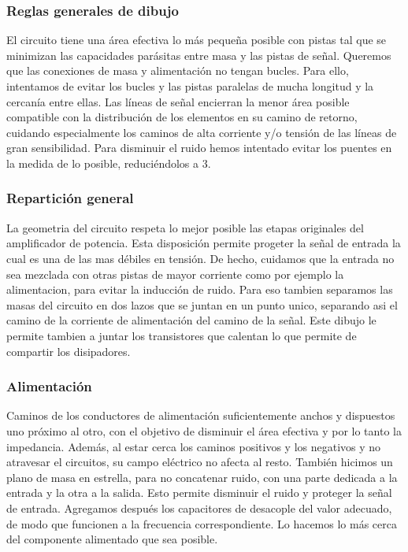 
\subsubsection*{Reglas generales de dibujo}

El circuito tiene una área efectiva lo más pequeña posible con pistas tal que se minimizan las capacidades parásitas entre masa y las pistas de señal.
Queremos que las conexiones de masa y alimentación no tengan bucles. Para ello, intentamos de evitar los bucles y las pistas paralelas de mucha longitud y la cercanía entre ellas.
Las líneas de señal encierran la menor área posible compatible con la distribución de los elementos en su camino de retorno, cuidando especialmente los caminos de alta corriente y/o tensión de las líneas de gran sensibilidad.
Para disminuir el ruido hemos intentado evitar los puentes en la medida de lo posible, reduciéndolos a 3.

\subsubsection*{Repartición general}
La geometria del circuito respeta lo mejor posible las etapas originales del amplificador de potencia.  Esta disposición permite progeter la señal de entrada la cual es una de las mas débiles en tensión. De hecho, cuidamos que la entrada no sea mezclada con otras pistas de mayor corriente como por ejemplo la alimentacion, para evitar la inducción de ruido. Para eso tambien separamos las masas del circuito en dos lazos que se juntan en un punto unico, separando asi el camino de la corriente de alimentación del camino de la señal.
Este dibujo le permite tambien a juntar los transistores que calentan lo que permite de compartir los disipadores.


\subsubsection*{Alimentación}
Caminos de los conductores de alimentación suficientemente anchos y  dispuestos uno próximo al otro, con el objetivo de disminuir el área efectiva y por lo tanto la impedancia. Además, al estar cerca los caminos positivos y los negativos y no atravesar el circuitos, su campo eléctrico no afecta al resto.
También hicimos un plano de masa en estrella, para no concatenar ruido, con una parte dedicada a la entrada y la otra a la salida. Esto permite disminuir el ruido y proteger la señal de entrada.
 Agregamos después los capacitores de desacople del valor adecuado, de modo que funcionen a la frecuencia correspondiente. Lo hacemos lo más cerca del componente alimentado que sea posible.

